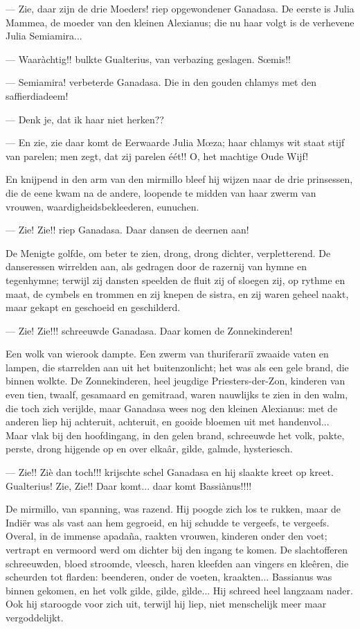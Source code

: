 \documentclass[a4paper, 12pt, oneside, dutch]{article}
\begin{document}
--- Zie, daar zijn de drie Moeders! riep opgewondener Ganadasa. De eerste is Julia Mammea, de moeder van den kleinen Alexianus; die nu haar volgt is de verhevene Julia Semiamira...

--- Waaràchtig!! bulkte Gualterius, van verbazing geslagen. Sœmis!!

--- Semiamira! verbeterde Ganadasa. Die in den gouden chlamys met den saffierdiadeem!

--- Denk je, dat ik haar niet herken??

--- En zie, zie daar komt de Eerwaarde Julia Mœza; haar chlamys wit staat stijf van parelen; men zegt, dat zij parelen éét!! O, het machtige Oude Wijf!

En knijpend in den arm van den mirmillo bleef hij wijzen naar de drie prinsessen, die de eene kwam na de andere, loopende te midden van haar zwerm van vrouwen, waardigheidsbekleederen, eunuchen.

--- Zie! Zie!! riep Ganadasa. Daar dansen de deernen aan!

De Menigte golfde, om beter te zien, drong, drong dichter, verpletterend. De danseressen wirrelden aan, als gedragen door de razernij van hymne en tegenhymne; terwijl zij dansten speelden de fluit zij of sloegen zij, op rythme en maat, de cymbels en trommen en zij knepen de sistra, en zij waren geheel naakt, maar gekapt en geschoeid en geschilderd.

--- Zie! Zie!!! schreeuwde Ganadasa. Daar komen de Zonnekinderen!

Een wolk van wierook dampte. Een zwerm van thuriferariï zwaaide vaten en lampen, die starrelden aan uit het buitenzonlicht; het was als een gele brand, die binnen wolkte. De Zonnekinderen, heel jeugdige Priesters-der-Zon, kinderen van even tien, twaalf, gesamaard en gemitraad, waren nauwlijks te zien in den walm, die toch zich verijlde, maar Ganadasa wees nog den kleinen Alexianus: met de anderen liep hij achteruit, achteruit, en gooide bloemen uit met handenvol... Maar vlak bij den hoofdingang, in den gelen brand, schreeuwde het volk, pakte, perste, drong hijgende op en over elkaâr, gilde, galmde, hysteriesch.

--- Zie!! Ziè dan toch!!! krijschte schel Ganadasa en hij slaakte kreet op kreet. Gualterius! Zie, Zie!! Daar komt... daar komt Bassiànus!!!!

De mirmillo, van spanning, was razend. Hij poogde zich los te rukken, maar de Indiër was als vast aan hem gegroeid, en hij schudde te vergeefs, te vergeefs. Overal, in de immense apadaña, raakten vrouwen, kinderen onder den voet; vertrapt en vermoord werd om dichter bij den ingang te komen. De slachtofferen schreeuwden, bloed stroomde, vleesch, haren kleefden aan vingers en kleêren, die scheurden tot flarden: beenderen, onder de voeten, kraakten... Bassianus was binnen gekomen, en het volk gilde, gilde, gìlde... Hij schreed heel langzaam nader. Ook hij staroogde voor zich uit, terwijl hij liep, niet menschelijk meer maar vergoddelijkt.
\end{document}
